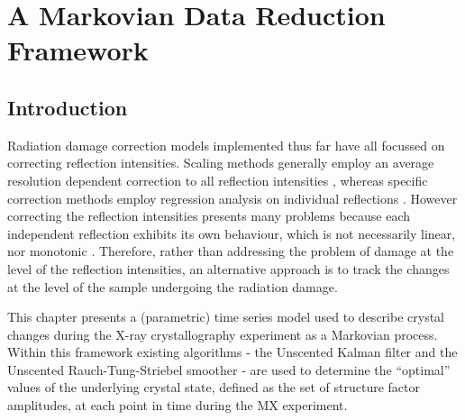 \chapter{A Markovian Data Reduction Framework}
\label{chap:A Markovian data reduction framework}

\section{Introduction}
\label{sec:Introduction - Data Reduction}
Radiation damage correction models implemented thus far have all focussed on correcting reflection intensities.
Scaling methods generally employ an average resolution dependent correction to all reflection intensities \cite{evans2005,evans2013,kabsch2010integration}, whereas specific correction methods employ regression analysis on individual reflections \cite{diederichs2003,diederichs2006}.
However correcting the reflection intensities presents many problems because each independent reflection exhibits its own behaviour, which is not necessarily linear, nor monotonic \cite{abrahams1987anisotropy}.
Therefore, rather than addressing the problem of damage at the level of the reflection intensities, an alternative approach is to track the changes at the level of the sample undergoing the radiation damage.

This chapter presents a (parametric) time series model used to describe crystal changes during the X-ray crystallography experiment as a Markovian process. Within this framework existing algorithms - the Unscented Kalman filter and the Unscented Rauch-Tung-Striebel smoother - are used to determine the ``optimal'' values of the underlying crystal state, defined as the set of structure factor amplitudes, at each point in time during the MX experiment.
